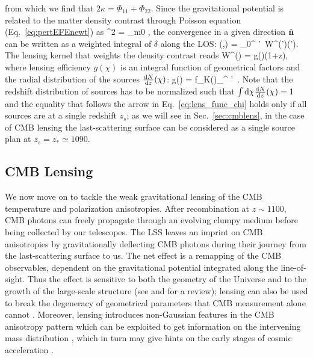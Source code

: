 % 
from which we find that $2\kappa = \Phi_{11}+\Phi_{22}$. Since the gravitational potential is related
to the matter density contrast through Poisson equation (Eq.~\eqref{eq:pertEFEnewt}) as 
%
\be
\nabla^2 \Phi = \Omega_{\rm m0} ,
\ee
%
the convergence in a given direction $\hat{\mathbf{n}}$ can be written as a weighted integral of $\delta$ along 
the \gls{LOS}:
%
\be
\label{lens:kappa}
\kappa(\nver,\chi) = \int_0^{\chi} \diff\chi'\, W^{\kappa}(\chi')\delta(\chi').
\ee
% 
The lensing kernel that weights the density contrast reads
%
\be
W^{\kappa}(\chi) =  g(\chi)(1+z),
\ee
%
where lensing efficiency $g(\chi)$ is an integral function of geometrical factors and the 
radial distribution of the sources
 $\frac{\mathop{}\!\mathrm{d} N}{\mathop{}\!\mathrm{d} z}(\chi)$:
%
\be
\label{eq:lens_func_chi}
g(\chi) = f_K(\chi)\int_{\chi}^{\infty} \diff\chi'\,  
 .
\ee
%
Note that the redshift distribution of sources has to be normalized such that $\int \mathop{}\!\mathrm{d}\chi \frac{\mathop{}\!\mathrm{d} N}{\mathop{}\!\mathrm{d} z}(\chi) = 1$ and the equality that follows the arrow in Eq.~\eqref{eq:lens_func_chi} holds only if all sources 
are at a single redshift $z_s$; as we will see in Sec.~\eqref{sec:cmblens}, in the case of CMB lensing the last-scattering surface can be considered as a single source plan at $z_s = z_* \simeq 1090$.


\subsection{CMB Lensing}
\label{sec:cmblens}
We now move on to tackle the weak gravitational lensing of the \gls{CMB} temperature and polarization 
anisotropies. After recombination at $z\sim 1100$, \gls{CMB} photons can freely propagate through an evolving 
clumpy medium before being collected by our telescopes. The \gls{LSS} leaves an imprint on \gls{CMB} anisotropies 
by gravitationally deflecting \gls{CMB} photons during their journey from the last-scattering surface to us. 
The net effect is a remapping of the \gls{CMB} observables, dependent on the gravitational potential integrated 
along the line-of-sight. Thus the effect is sensitive to both the geometry of the Universe and to the 
growth of the large-scale structure (see \cite{Blanchard1987,Cole1989} and \cite{Lewis2006} for a review);
lensing can also be used to break the degeneracy of geometrical parameters that \gls{CMB} measurement 
alone cannot \citep{Stompor1999,Sherwin2011}.  
Moreover, lensing introduces non-Gaussian features in the \gls{CMB} anisotropy  pattern which  can be 
exploited to  get information on the intervening mass distribution \citep{Hu2002,Hirata2003},  which in turn 
may give hints on the early stages of cosmic acceleration \citep{Acquaviva2006, Hu2006}.

